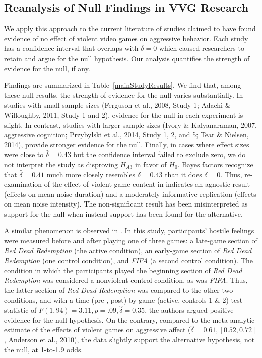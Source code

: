 \documentclass[man]{apa6}
\begin{document}
\subsection{Reanalysis of Null Findings in VVG Research}
We apply this approach to the current literature of studies claimed to have found evidence of no effect of violent video games on aggressive behavior. Each study has a confidence interval that overlaps with $\delta = 0$ which caused researchers to retain and argue for the null hypothesis. Our analysis quantifies the strength of evidence for the null, if any.

Findings are summarized in Table~\ref{mainStudyResults}. We find that, among these null results, the strength of evidence for the null varies substantially. In studies with small sample sizes (Ferguson et al., 2008, Study 1; Adachi \& Willoughby, 2011, Study 1 and 2), evidence for the null in each experiment is slight. 
In contrast, studies with larger sample sizes (Ivory \& Kalyanaraman, 2007, aggressive cognition; Przybylski et al., 2014, Study 1, 2, and 5; Tear \& Nielsen, 2014), \nocite{Ivory:Kalyanaraman:2007,Przybylski:etal:2014,Tear:Nielsen:2014} provide stronger evidence for the null.	Finally, in cases where effect sizes were close to $\hat{\delta} = 0.43$ but the confidence interval failed to exclude zero, we do not interpret the study as disproving $H_{A3}$ in favor of $H_0$. Bayes factors recognize that $\hat{\delta} = 0.41$ much more closely resembles $\delta = 0.43$ than it does $\delta = 0$. 
Thus, re-examination of the effect of violent game content in \citet{Elson:etal:2013} indicates an agnostic result (effects on mean noise duration) and a moderately informative replication (effects on mean noise intensity). The non-significant result has been misinterpreted as support for the null when instead support has been found for the alternative.  

A similar phenomenon is observed in \citet{Valadez:Ferguson:2012}. In this study, participants' hostile feelings were measured before and after playing one of three games: a late-game section of {\em Red Dead Redemption} (the active condition), an early-game section of {\em Red Dead Redemption} (one control condition), and {\em FIFA} (a second control condition). The condition in which the participants played the beginning section of {\em Red Dead Redemption} was considered a nonviolent control condition, as was {\em FIFA}. Thus, the latter section of {\em Red Dead Redemption} was compared to the other two conditions, and with a time (pre-, post) by game (active, controls 1 \& 2) test statistic of $F(1, 94) = 3.11, p = .09, \hat{\delta} = 0.35$, the authors argued positive evidence for the null hypothesis. On the contrary, compared to the meta-analytic estimate of the effects of violent games on aggressive affect ($\hat{\delta} = 0.61, [0.52, 0.72]$, Anderson et al., 2010), the data slightly support the alternative hypothesis, not the null, at 1-to-1.9 odds. 
\end{document}
